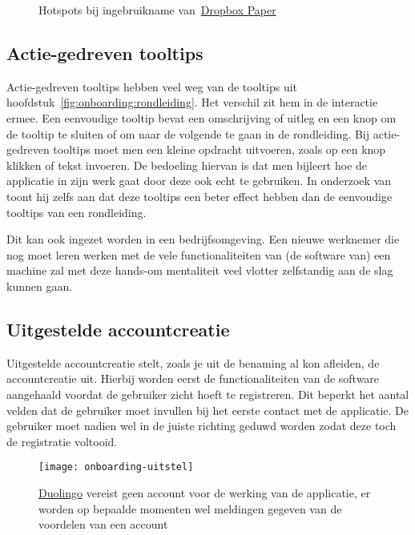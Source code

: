 \begin{figure}[h!]
    \centering
    \qquad
    \caption[Voorbeeld hotspots]{Hotspots bij ingebruikname van~\href{https://www.dropbox.com/paper}{Dropbox Paper}}
    \label{fig:onboarding:hotspots}
\end{figure}

\subsection{Actie-gedreven tooltips}
\label{sec:onboarding:actie-tooltips}

Actie-gedreven tooltips hebben veel weg van de tooltips uit hoofdstuk~\ref{fig:onboarding:rondleiding}. Het verschil zit hem in de interactie ermee. Een eenvoudige tooltip bevat een omschrijving of uitleg en een knop om de tooltip te sluiten of om naar de volgende te gaan in de rondleiding. Bij actie-gedreven tooltips moet men een kleine opdracht uitvoeren, zoals op een knop klikken of tekst invoeren. De bedoeling hiervan is dat men bijleert hoe de applicatie in zijn werk gaat door deze ook echt te gebruiken. In onderzoek van~\textcite{Oliveira2019} toont hij zelfs aan dat deze tooltips een beter effect hebben dan de eenvoudige tooltips van een rondleiding.

Dit kan ook ingezet worden in een bedrijfsomgeving. Een nieuwe werknemer die nog moet leren werken met de vele functionaliteiten van (de software van) een machine zal met deze hands-om mentaliteit veel vlotter zelfstandig aan de slag kunnen gaan.

\subsection{Uitgestelde accountcreatie}
\label{sec:onboarding:uitgestelde-accountcreatie}

Uitgestelde accountcreatie stelt, zoals je uit de benaming al kon afleiden, de accountcreatie uit. Hierbij worden eerst de functionaliteiten van de software aangehaald voordat de gebruiker zicht hoeft te registreren. Dit beperkt het aantal velden dat de gebruiker moet invullen bij het eerste contact met de applicatie. De gebruiker moet nadien wel in de juiste richting geduwd worden zodat deze toch de registratie voltooid.

\begin{figure}[h!]
    \centering
    \texttt{[image: onboarding-uitstel]}
    \caption[Voorbeeld uitgestelde accountcreatie]{\href{https://www.duolingo.com/}{Duolingo} vereist geen account voor de werking van de applicatie, er worden op bepaalde momenten wel meldingen gegeven van de voordelen van een account}
    \label{fig:onboarding:uitgestelde-accountcreatie}
\end{figure}

